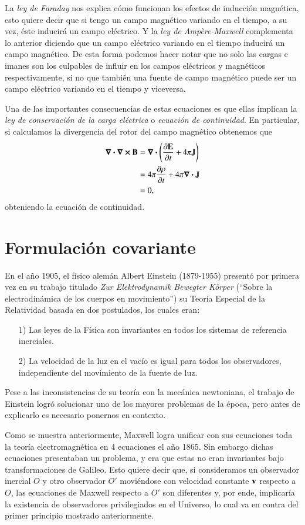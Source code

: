 La \textit{ley de Faraday} nos explica cómo funcionan los efectos de inducción magnética, esto quiere decir que si tengo un campo magnético variando en el tiempo, a su vez, éste inducirá un campo eléctrico.  Y la \textit{ley de Ampère-Maxwell} complementa lo anterior diciendo que un campo eléctrico variando en el tiempo inducirá un campo magnético. De esta forma podemos hacer notar que no solo las cargas e imanes son los culpables de influir en los campos eléctricos y magnéticos respectivamente, si no que también una fuente de campo magnético puede ser un campo eléctrico variando en el tiempo y viceversa.

Una de las importantes consecuencias de estas ecuaciones es que ellas implican la \textit{ley de conservación de la carga eléctrica} o \textit{ecuación de continuidad}. En particular, si calculamos la divergencia del rotor del campo magnético obtenemos que
\begin{align}
\div{\curl{\vb{B}}} &= \div{ \left( \pdv{\vb{E}}{t} + 4\pi \vb{J} \right) }\\
&= 4\pi \pdv{\rho}{t} + 4\pi \div{\vb{J}}\\
&= 0,
\end{align}
obteniendo la ecuación de continuidad.

\section{Formulación covariante}

En el año 1905, el físico alemán Albert Einstein (1879-1955) presentó por primera vez en su trabajo titulado \textit{Zur Elektrodynamik Bewegter Körper} \cite{Einstein} (``Sobre la electrodinámica de los cuerpos en movimiento'') su Teoría Especial de la Relatividad basada en dos postulados, los cuales eran:
\begin{itemize}
\item[1)] Las leyes de la Física son invariantes en todos los sistemas de referencia inerciales.
\item[2)] La velocidad de la luz en el vacío es igual para todos los observadores, independiente del movimiento de la fuente de luz.
\end{itemize}

Pese a las inconsistencias de su teoría con la mecánica newtoniana, el trabajo de Einstein logró solucionar uno de los mayores problemas de la época, pero antes de explicarlo es necesario ponernos en contexto.

Como se muestra anteriormente, Maxwell logra unificar con sus ecuaciones toda la teoría electromagnética en 4 ecuaciones el año 1865. Sin embargo dichas ecuaciones presentaban un problema, y era que estas no eran invariantes bajo transformaciones de Galileo. Esto quiere decir que, si consideramos un observador inercial $O$ y otro observador $O'$ moviéndose con velocidad constante $\vb{v}$ respecto a $O$, las ecuaciones de Maxwell respecto a $O'$ son diferentes y, por ende, implicaría la existencia de observadores privilegiados en el Universo, lo cual va en contra del primer principio mostrado anteriormente. 

